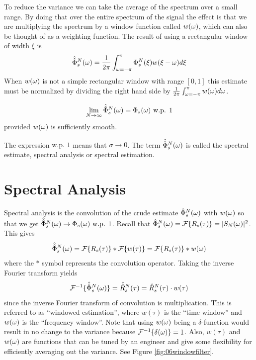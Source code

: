 To reduce the variance we can take the average of the spectrum over a small range. By doing that over the entire spectrum of the signal the effect is that we are multiplying the spectrum by a window function called $w(\omega)$, which can also be thought of as a weighting function. The result of using a rectangular window of width $\xi$ is
$$\hat{\hat{\Phi}}_s^N(\omega) = \frac{1}{2\pi}\int_{\omega=-\pi}^\pi \Phi_s^N(\xi)w(\xi-\omega)d\xi$$
When $w(\omega)$ is not a simple rectangular window with range $[0,1]$ this estimate must be normalized by dividing the right hand side by $\frac{1}{2\pi}\int_{\omega=-\pi}^\pi w(\omega)d\omega$.

\begin{theorem}
$$\lim_{N\to\infty}\hat{\hat{\Phi}}_s^N(\omega) = \Phi_s(\omega) \text{ w.p. } 1$$
provided $w(\omega)$ is sufficiently smooth.
\end{theorem}
The expression $\text{w.p. } 1$ means that $\sigma\to 0$. The term $\hat{\hat{\Phi}}_s^N(\omega)$ is called the spectral estimate, spectral analysis or spectral estimation.

\section{Spectral Analysis}
Spectral analysis is the convolution of the crude estimate $\hat{\Phi}_s^N(\omega)$ with $w(\omega)$ so that we get $\hat{\hat{\Phi}}_s^N(\omega) \to \Phi_s(\omega) \text{ w.p. } 1$. Recall that $\hat{\Phi}_s^N(\omega) = \mathcal{F}\{R_s(\tau)\} = |S_N(\omega)|^2$. This gives
$$\hat{\hat{\Phi}}_s^N(\omega) = \mathcal{F}\{R_s(\tau)\} * \mathcal{F}\{w(\tau)\} = \mathcal{F}\{R_s(\tau)\} * w(\omega)$$
where the $*$ symbol represents the convolution operator. Taking the inverse Fourier transform yields
$$\mathcal{F}^{-1}\{\hat{\hat{\Phi}}_s^N(\omega)\} = \hat{\hat{R}}_s^N(\tau) = \hat{R}_s^N(\tau)\cdot w(\tau)$$
since the inverse Fourier transform of convolution is multiplication. This is referred to as ``windowed estimation'', where $w(\tau)$ is the ``time window'' and $w(\omega)$ is the ``frequency window''. Note that using $w(\omega)$ being a $\delta$-function would result in no change to the variance because $\mathcal{F}^{-1}\{\delta(\omega)\} = 1$. Also, $w(\tau)$ and $w(\omega)$ are functions that can be tuned by an engineer and give some flexibility for efficiently averaging out the variance. See Figure \ref{fig:06windowfilter}.

